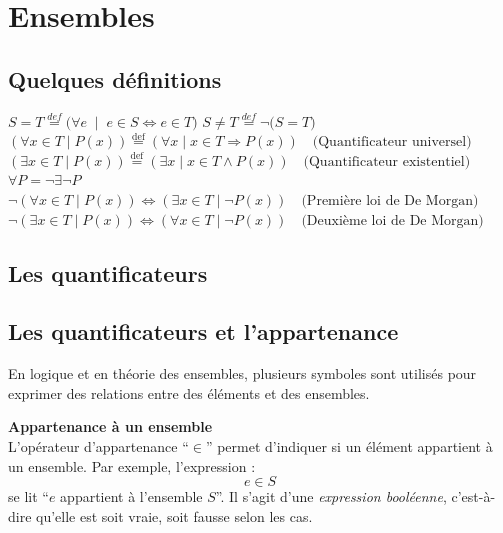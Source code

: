 \documentclass[12]{article}%
\theoremstyle{plain}
\theoremstyle{definition}
\theoremstyle{remark}
\begin{document}
\newpage
\section{Ensembles}
\subsection{Quelques définitions}
\(
S = T \overset{def}{=} \big( 
\forall e \;\mid\; e \in S \iff e \in T 
\big)
\)
\newline\newline
\(
S \neq T \overset{def}{=} \lnot \big( S = T\big)
\)
\newline\newline
\(
(\forall x \in T \mid P(x)) \overset{\text{def}}{=} (\forall x \mid x \in T \Rightarrow P(x)) \quad \text{(Quantificateur universel)}
\)
\newline\newline
\(
(\exists x \in T \mid P(x)) \overset{\text{def}}{=} (\exists x \mid x \in T \land P(x)) \quad \text{(Quantificateur existentiel)}
\)
\newline\newline
\(
\forall P = \lnot \exists \lnot P
\)
\newline\newline
\(
\lnot\left(\forall x \in \mathit{T} \;|\; \mathit{P}(x) \right) \iff (\exists x \in \mathit{T} \;|\; \lnot \mathit{P}(x)) \quad \text{(Première loi de De Morgan)}
\)
\newline\newline
\(
\lnot\left(\exists x \in \mathit{T} \;|\; \mathit{P}(x) \right) \iff (\forall x \in \mathit{T} \;|\; \lnot \mathit{P}(x)) \quad \text{(Deuxième loi de De Morgan)}
\)

\subsection{Les quantificateurs}
\subsection{Les quantificateurs et l'appartenance}

En logique et en théorie des ensembles, plusieurs symboles sont utilisés pour exprimer des relations entre des éléments et des ensembles.

\bigskip

\textbf{Appartenance à un ensemble} \\
L’opérateur d’appartenance “$\in$” permet d’indiquer si un élément appartient à un ensemble. Par exemple, l’expression :
\[
e \in S
\]
se lit “$e$ appartient à l’ensemble $S$”. Il s’agit d’une \textit{expression booléenne}, c’est-à-dire qu’elle est soit vraie, soit fausse selon les cas.
\end{document}
